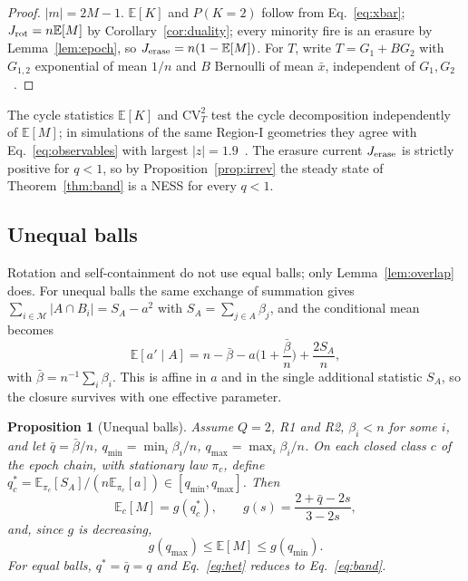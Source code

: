 \documentclass[aps,pre,reprint,superscriptaddress,amsmath,amssymb,longbibliography]{revtex4-2}
\newtheorem{proposition}{Proposition}
\theoremstyle{remark}
\newcommand{\E}{\mathbb{E}}
\begin{document}
\begin{proof}
$|m|=2M-1$. $\E[K]$ and $P(K=2)$ follow from Eq.~\eqref{eq:xbar};
$J_{\rm rot}=n\E[M]$ by Corollary~\ref{cor:duality}; every minority
fire is an erasure by Lemma~\ref{lem:epoch}, so
$J_{\rm erase}=n(1-\E[M])$. For $T$, write $T=G_1+BG_2$ with
$G_{1,2}$ exponential of mean $1/n$ and $B$ Bernoulli of mean $\bar x$,
independent of $G_1,G_2$~\cite{SM}.
\end{proof}

The cycle statistics $\E[K]$ and $\mathrm{CV}_T^2$ test the cycle
decomposition independently of $\E[M]$; in simulations of the same
Region-I geometries they agree with Eq.~\eqref{eq:observables} with
largest $|z|=1.9$~\cite{SM}. The erasure current $J_{\rm erase}$ is
strictly positive for $q<1$, so by Proposition~\ref{prop:irrev} the
steady state of Theorem~\ref{thm:band} is a NESS for every $q<1$.

\subsection{Unequal balls}

Rotation and self-containment do not use equal balls; only
Lemma~\ref{lem:overlap} does. For unequal balls the same exchange of
summation gives $\sum_{i\in\mathcal M}|A\cap B_i|=S_A-a^2$ with
$S_A=\sum_{j\in A}\beta_j$, and the conditional mean becomes
\begin{equation}
\E[a'\mid A]=n-\bar\beta-a\Big(1+\frac{\bar\beta}{n}\Big)+\frac{2S_A}{n},
\label{eq:affine-het}
\end{equation}
with $\bar\beta=n^{-1}\sum_i\beta_i$. This is affine in $a$ and in the
single additional statistic $S_A$, so the closure survives with one
effective parameter.

\begin{proposition}[Unequal balls]
\label{prop:het}
Assume $Q=2$, R1 and R2, $\beta_i<n$ for some $i$, and let $\bar q=\bar\beta/n$,
$q_{\min}=\min_i\beta_i/n$, $q_{\max}=\max_i\beta_i/n$. On each closed
class $c$ of the epoch chain, with stationary law $\pi_c$, define
$q^\ast_c=\E_{\pi_c}[S_A]/(n\E_{\pi_c}[a])\in[q_{\min},q_{\max}]$. Then
\begin{equation}
\E_c[M]=g(q^\ast_c),\qquad g(s)=\frac{2+\bar q-2s}{3-2s},
\label{eq:het}
\end{equation}
and, since $g$ is decreasing,
\begin{equation}
g(q_{\max})\le\E[M]\le g(q_{\min}).
\label{eq:het-bounds}
\end{equation}
For equal balls, $q^\ast=\bar q=q$ and Eq.~\eqref{eq:het} reduces to
Eq.~\eqref{eq:band}.
\end{proposition}
\end{document}
